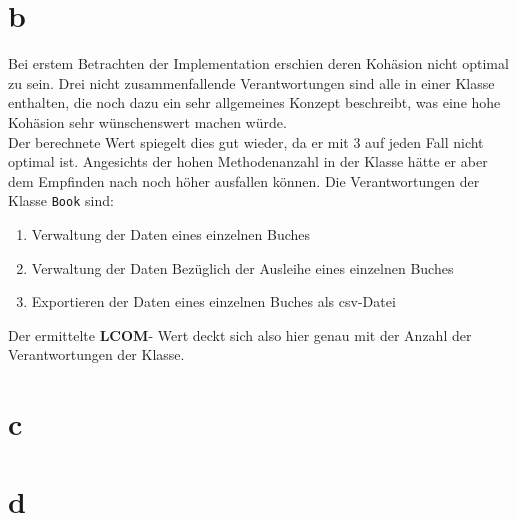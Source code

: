 \section*{b}
Bei erstem Betrachten der Implementation erschien deren Kohäsion nicht optimal zu sein. Drei nicht zusammenfallende Verantwortungen sind alle in einer Klasse enthalten, die noch dazu ein sehr allgemeines Konzept beschreibt, was eine hohe Kohäsion sehr wünschenswert machen würde.\\
Der berechnete Wert spiegelt dies gut wieder, da er mit 3 auf jeden Fall nicht optimal ist. Angesichts der hohen Methodenanzahl in der Klasse hätte er aber dem Empfinden nach noch höher ausfallen können.
Die Verantwortungen der Klasse \texttt{Book} sind:
\begin{enumerate}
	\item Verwaltung der Daten eines einzelnen Buches
	\item Verwaltung der Daten Bezüglich der Ausleihe eines einzelnen Buches
	\item Exportieren der Daten eines einzelnen Buches als csv-Datei
\end{enumerate}
 Der ermittelte \textbf{LCOM}- Wert deckt sich also hier genau mit der Anzahl der Verantwortungen der Klasse.
 
 
\section*{c}
\section*{d} 